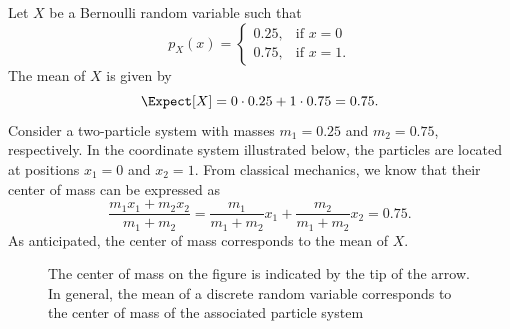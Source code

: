 \begin{example}
Let $X$ be a Bernoulli random variable such that
\begin{equation*}
p_X (x) = \begin{cases}
0.25, & \text{if }x = 0 \\
0.75, & \text{if }x = 1.
\end{cases}
\end{equation*}
The mean of $X$ is given by
\begin{equation*}
\Expect [X] = 0 \cdot 0.25 + 1 \cdot 0.75 = 0.75 .
\end{equation*}
Consider a two-particle system with masses $m_1 = 0.25$ and $m_2 = 0.75$, respectively.
In the coordinate system illustrated below, the particles are located at positions $x_1 = 0$ and $x_2 = 1$.
From classical mechanics, we know that their center of mass can be expressed as
\begin{equation*}
\frac{ m_1 x_1 + m_2 x_2 }{ m_1 + m_2 }
 = \frac{ m_1 }{ m_1 + m_2 } x_1 + \frac{ m_2 }{ m_1 + m_2 } x_2
 = 0.75 .
\end{equation*}
As anticipated, the center of mass corresponds to the mean of $X$.

\begin{figure}[ht]
\begin{center}
\begin{footnotesize}
\end{footnotesize}
\caption{The center of mass on the figure is indicated by the tip of the arrow.
In general, the mean of a discrete random variable corresponds to the center of mass of the associated particle system}
\end{center}
\end{figure}
\end{example}


